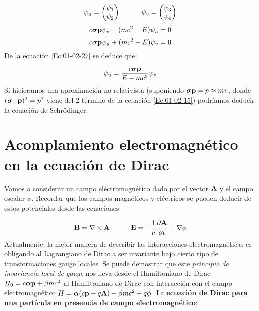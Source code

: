 \begin{equation}
    \psi_u = \begin{pmatrix}
        \psi_1 \\ \psi_2 \end{pmatrix}  \quad \quad \quad \psi_v= \begin{pmatrix}
            \psi_3 \\ \psi_4 \end{pmatrix}
\end{equation}
\begin{equation}
    c \boldsymbol{\sigma} \mathbf{p} \psi_v + (mc^2 -E) \psi_u = 0 \label{Ec:01-02-27}
\end{equation}
\begin{equation}
    c \boldsymbol{\sigma} \mathbf{p} \psi_u + (mc^2 -E) \psi_v = 0
\end{equation}
De la ecuación \ref{Ec:01-02-27} se deduce que: 

\begin{equation}
    \psi_u =  \frac{c \boldsymbol{\sigma} \mathbf{p}}{E - mc^2} \psi_v
\end{equation}
Si hicieramos una aproximación no relativista (suponiendo $\boldsymbol{\sigma} \mathbf{p}= p \approx mv$, donde $(\boldsymbol{\sigma} \cdot \mathbf{p} )^2= p^2$ viene del 2 término de la ecuación \ref{Ec:01-02-15}) podríamos deducir la ecuación de Schrödinger.

\section{Acomplamiento electromagnético en la ecuación de Dirac}

Vamos a considerar un campo eléctromagnético dado por el vector $\mathbf{A}$ y el campo escalar $\phi$. Recordar que los campos magnéticos y eléctricos se pueden deducir de estos potenciales desde las ecuaciones

\begin{equation}
    \mathbf{B} = \nabla \times \mathbf{A} \quad \quad \quad \mathbf{E} = - \frac{1}{c} \frac{\partial \mathbf{A}}{\partial t} - \nabla \phi
\end{equation}
Actualmente, la mejor manera de describir las interacciones electromagnéticas es obligando al Lagrangiano de Dirac a ser invariante bajo cierto tipo de transformaciones gauge locales. Se puede demostrar que este \textit{principio de invariancia local de gauge} nos lleva desde el Hamiltoniano de Dirac $H_0 = c \boldsymbol{\alpha} \mathbf{p} + \beta mc^2$ al Hamiltoniano de Dirac con interacción con el campo electromagnético $H=\boldsymbol{\alpha} (c\mathbf{p} - q \mathbf{A}) + \beta mc^2 + q\phi$. La \textbf{ecuación de Dirac para una partícula en presencia de campo electromagnético}:

